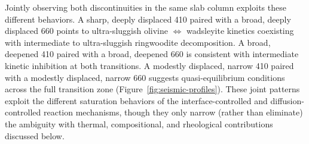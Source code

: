 \documentclass[draft,linenumbers]{agujournal2019}
\begin{document}
Jointly observing both discontinuities in the same slab column exploits
these different behaviors. A sharp, deeply displaced 410 paired with a
broad, deeply displaced 660 points to ultra-sluggish olivine
\(\Leftrightarrow\) wadsleyite kinetics coexisting with intermediate to
ultra-sluggish ringwoodite decomposition. A broad, deepened 410 paired
with a broad, deepened 660 is consistent with intermediate kinetic
inhibition at both transitions. A modestly displaced, narrow 410 paired
with a modestly displaced, narrow 660 suggests quasi-equilibrium
conditions across the full transition zone
(Figure~\ref{fig:seismic-profiles}). These joint patterns exploit the
different saturation behaviors of the interface-controlled and
diffusion-controlled reaction mechanisms, though they only narrow
(rather than eliminate) the ambiguity with thermal, compositional, and
rheological contributions discussed below.
\end{document}
